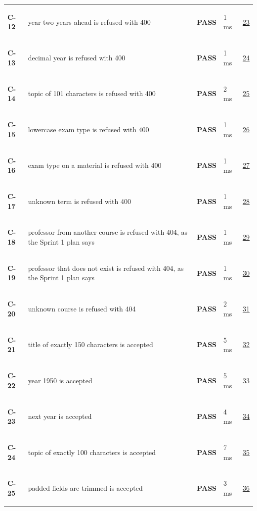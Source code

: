 \documentclass[10pt,a4paper]{article}
\begin{document}
\begin{longtable}{@{}P{1.2cm}P{9.2cm}P{1.2cm}P{1.3cm}P{2.4cm}@{}}
\hypertarget{test-C-12}{\textbf{C-12}} & year two years ahead is refused with 400 & \textcolor{passgreen}{\textbf{PASS}} & 1 ms & \hyperlink{call23}{23} \\
\hypertarget{test-C-13}{\textbf{C-13}} & decimal year is refused with 400 & \textcolor{passgreen}{\textbf{PASS}} & 1 ms & \hyperlink{call24}{24} \\
\hypertarget{test-C-14}{\textbf{C-14}} & topic of 101 characters is refused with 400 & \textcolor{passgreen}{\textbf{PASS}} & 2 ms & \hyperlink{call25}{25} \\
\hypertarget{test-C-15}{\textbf{C-15}} & lowercase exam type is refused with 400 & \textcolor{passgreen}{\textbf{PASS}} & 1 ms & \hyperlink{call26}{26} \\
\hypertarget{test-C-16}{\textbf{C-16}} & exam type on a material is refused with 400 & \textcolor{passgreen}{\textbf{PASS}} & 1 ms & \hyperlink{call27}{27} \\
\hypertarget{test-C-17}{\textbf{C-17}} & unknown term is refused with 400 & \textcolor{passgreen}{\textbf{PASS}} & 1 ms & \hyperlink{call28}{28} \\
\hypertarget{test-C-18}{\textbf{C-18}} & professor from another course is refused with 404, as the Sprint 1 plan says & \textcolor{passgreen}{\textbf{PASS}} & 1 ms & \hyperlink{call29}{29} \\
\hypertarget{test-C-19}{\textbf{C-19}} & professor that does not exist is refused with 404, as the Sprint 1 plan says & \textcolor{passgreen}{\textbf{PASS}} & 1 ms & \hyperlink{call30}{30} \\
\hypertarget{test-C-20}{\textbf{C-20}} & unknown course is refused with 404 & \textcolor{passgreen}{\textbf{PASS}} & 2 ms & \hyperlink{call31}{31} \\
\hypertarget{test-C-21}{\textbf{C-21}} & title of exactly 150 characters is accepted & \textcolor{passgreen}{\textbf{PASS}} & 5 ms & \hyperlink{call32}{32} \\
\hypertarget{test-C-22}{\textbf{C-22}} & year 1950 is accepted & \textcolor{passgreen}{\textbf{PASS}} & 5 ms & \hyperlink{call33}{33} \\
\hypertarget{test-C-23}{\textbf{C-23}} & next year is accepted & \textcolor{passgreen}{\textbf{PASS}} & 4 ms & \hyperlink{call34}{34} \\
\hypertarget{test-C-24}{\textbf{C-24}} & topic of exactly 100 characters is accepted & \textcolor{passgreen}{\textbf{PASS}} & 7 ms & \hyperlink{call35}{35} \\
\hypertarget{test-C-25}{\textbf{C-25}} & padded fields are trimmed is accepted & \textcolor{passgreen}{\textbf{PASS}} & 3 ms & \hyperlink{call36}{36} \\

\end{longtable}
\end{document}
